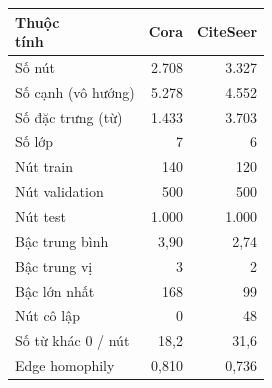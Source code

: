 \begin{tabular}{lrr}
\toprule
\makecell[l]{Thuộc\\tính} & Cora & CiteSeer \\
\midrule
Số nút & 2{.}708 & 3{.}327 \\
Số cạnh (vô hướng) & 5{.}278 & 4{.}552 \\
Số đặc trưng (từ) & 1{.}433 & 3{.}703 \\
Số lớp & 7 & 6 \\
Nút train & 140 & 120 \\
Nút validation & 500 & 500 \\
Nút test & 1{.}000 & 1{.}000 \\
Bậc trung bình & 3{,}90 & 2{,}74 \\
Bậc trung vị & 3 & 2 \\
Bậc lớn nhất & 168 & 99 \\
Nút cô lập & 0 & 48 \\
Số từ khác 0 / nút & 18{,}2 & 31{,}6 \\
Edge homophily & 0{,}810 & 0{,}736 \\
\bottomrule
\end{tabular}
